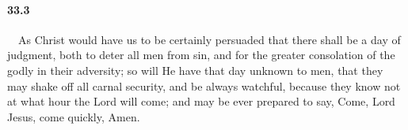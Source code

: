 \paragraph{33.3}\ \ As Christ would have us to be certainly persuaded that there shall be a day of judgment, both to deter all men from sin, and for the greater consolation of the godly in their adversity; so will He have that day unknown to men, that they may shake off all carnal security, and be always watchful, because they know not at what hour the Lord will come; and may be ever prepared to say, Come, Lord Jesus, come quickly, Amen. 
